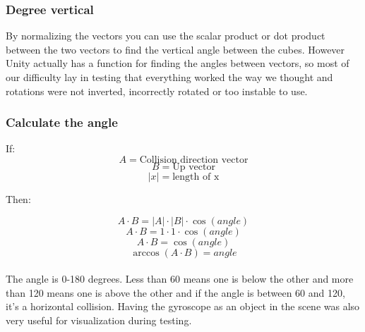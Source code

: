 \subsubsection{Degree vertical}
By normalizing the vectors you can use the scalar product or dot product between the two vectors to find the vertical angle between the cubes. However Unity actually has a function for finding the angles between vectors, so most of our difficulty lay in testing that everything worked the way we thought and rotations were not inverted, incorrectly rotated or too instable to use.


\subsubsection{Calculate the angle}
\newcommand{\norm}[1]{\lvert #1 \rvert}

If:
\[
A = \text{Collision direction vector}
\]
\[
B = \text{Up vector}
\]
\[
\norm{x} = \text{length of x}
\]

Then:

\[
A \cdot B = \norm{A} \cdot \norm{B} \cdot \cos(angle)
\]
\[
A \cdot B = 1 \cdot 1 \cdot \cos(angle)
\]
\[
A \cdot B = \cos(angle)
\]
\[
\arccos(A \cdot B) = angle
\]


\paragraph{}
 The angle is 0-180 degrees. Less than 60 means one is below the other and more than 120 means one is above the other and if the angle is between 60 and 120, it's a horizontal collision. Having the gyroscope as an object in the scene was also very useful for visualization during testing.

